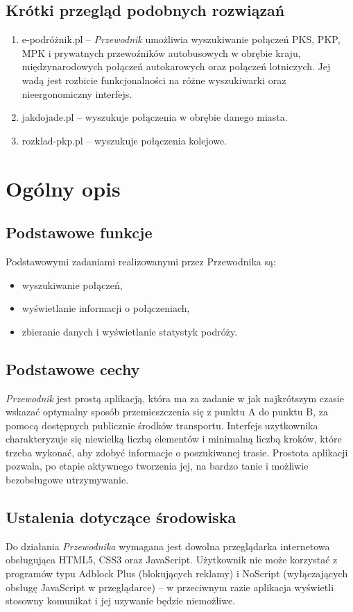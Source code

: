 \documentclass[12pt,a4paper]{report}
\begin{document}
\subsection{Krótki przegląd podobnych rozwiązań}
\begin{enumerate}
	\item e-podróżnik.pl -- \emph{Przewodnik} umożliwia wyszukiwanie połączeń PKS, PKP, MPK i prywatnych przewoźników autobusowych w obrębie kraju, międzynarodowych połączeń autokarowych oraz połączeń lotniczych. Jej wadą jest rozbicie funkcjonalności na różne wyszukiwarki oraz nieergonomiczny interfejs.
	\item jakdojade.pl -- wyszukuje połączenia w obrębie danego miasta.
	\item rozklad-pkp.pl -- wyszukuje połączenia kolejowe.
\end{enumerate}
\newpage
\section{Ogólny opis}
\subsection{Podstawowe funkcje}
	Podstawowymi zadaniami realizowanymi przez Przewodnika są:
	\begin{itemize}
	 	\item wyszukiwanie połączeń,
	 	\item wyświetlanie informacji o połączeniach,
	 	\item zbieranie danych i wyświetlanie statystyk podróży.
	\end{itemize}
\subsection{Podstawowe cechy}
	\emph{Przewodnik} jest prostą aplikacją, która ma za zadanie w jak najkrótszym czasie wskazać optymalny sposób przemieszczenia się z punktu A do punktu B, za pomocą dostępnych publicznie środków transportu. Interfejs uzytkownika charakteryzuje się niewielką liczbą elementów i minimalną liczbą kroków, które trzeba wykonać, aby zdobyć informacje o poszukiwanej trasie. Prostota aplikacji pozwala, po etapie aktywnego tworzenia jej, na bardzo tanie i możliwie bezobsługowe utrzymywanie.
\subsection{Ustalenia dotyczące środowiska}
	Do działania \emph{Przewodnika} wymagana jest dowolna przeglądarka internetowa obsługująca HTML5, CSS3 oraz JavaScript. Użytkownik nie może korzystać z programów typu Adblock Plus (blokujących reklamy) i NoScript (wyłączających obsługę JavaScript w przeglądarce) -- w przeciwnym razie aplikacja wyświetli stosowny komunikat i jej uzywanie będzie niemożliwe.
\end{document}
